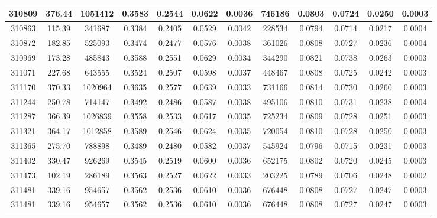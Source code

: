 \documentclass[10pt]{extarticle}
\begin{document}
\begin{longtable}{|c|c|c|c|c|c|c|c|c|c|c|c|}
\hline 
310809&376.44&1051412&0.3583&0.2544&0.0622&0.0036&746186&0.0803&0.0724&0.0250&0.0003 \\ 
\hline 
310863&115.39&341687&0.3384&0.2405&0.0529&0.0042&228534&0.0794&0.0714&0.0217&0.0004 \\ 
\hline 
310872&182.85&525093&0.3474&0.2477&0.0576&0.0038&361026&0.0808&0.0727&0.0236&0.0004 \\ 
\hline 
310969&173.28&485843&0.3588&0.2551&0.0629&0.0034&344290&0.0821&0.0738&0.0263&0.0003 \\ 
\hline 
311071&227.68&643555&0.3524&0.2507&0.0598&0.0037&448467&0.0808&0.0725&0.0242&0.0003 \\ 
\hline 
311170&370.33&1020964&0.3635&0.2577&0.0639&0.0033&731166&0.0814&0.0730&0.0260&0.0003 \\ 
\hline 
311244&250.78&714147&0.3492&0.2486&0.0587&0.0038&495106&0.0810&0.0731&0.0238&0.0004 \\ 
\hline 
311287&366.39&1026839&0.3558&0.2533&0.0617&0.0035&725234&0.0809&0.0728&0.0251&0.0003 \\ 
\hline 
311321&364.17&1012858&0.3589&0.2546&0.0624&0.0035&720054&0.0810&0.0728&0.0250&0.0003 \\ 
\hline 
311365&275.70&788898&0.3489&0.2480&0.0582&0.0037&545924&0.0796&0.0715&0.0231&0.0003 \\ 
\hline 
311402&330.47&926269&0.3545&0.2519&0.0600&0.0036&652175&0.0802&0.0720&0.0245&0.0003 \\ 
\hline 
311473&102.19&286189&0.3563&0.2527&0.0622&0.0033&203225&0.0789&0.0706&0.0248&0.0002 \\ 
\hline 
311481&339.16&954657&0.3562&0.2536&0.0610&0.0036&676448&0.0808&0.0727&0.0247&0.0003 \\ 
\hline 
311481&339.16&954657&0.3562&0.2536&0.0610&0.0036&676448&0.0808&0.0727&0.0247&0.0003 \\ 
\hline 
\end{longtable} 
\end{document}
